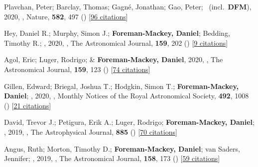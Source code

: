 \item[{\color{numcolor}\scriptsize55}] Plavchan, Peter; Barclay, Thomas; Gagn{\'e}, Jonathan; Gao, Peter; \etal\ (incl.\ \textbf{DFM}), 2020, , Nature, \textbf{582}, 497 () [\href{https://ui.adsabs.harvard.edu/abs/2020Natur.582..497P}{96 citations}]

\item[{\color{numcolor}\scriptsize54}] Hey, Daniel R.; Murphy, Simon J.; \textbf{Foreman-Mackey, Daniel}; Bedding, Timothy R.; \etal, 2020, , The Astronomical Journal, \textbf{159}, 202 () [\href{https://ui.adsabs.harvard.edu/abs/2020AJ....159..202H}{9 citations}]

\item[{\color{numcolor}\scriptsize53}] Agol, Eric; Luger, Rodrigo; \& \textbf{Foreman-Mackey, Daniel}, 2020, , The Astronomical Journal, \textbf{159}, 123 () [\href{https://ui.adsabs.harvard.edu/abs/2020AJ....159..123A}{74 citations}]

\item[{\color{numcolor}\scriptsize52}] Gillen, Edward; Briegal, Joshua T.; Hodgkin, Simon T.; \textbf{Foreman-Mackey, Daniel}; \etal, 2020, , Monthly Notices of the Royal Astronomical Society, \textbf{492}, 1008 () [\href{https://ui.adsabs.harvard.edu/abs/2020MNRAS.492.1008G}{21 citations}]

\item[{\color{numcolor}\scriptsize51}] David, Trevor J.; Petigura, Erik A.; Luger, Rodrigo; \textbf{Foreman-Mackey, Daniel}; \etal, 2019, , The Astrophysical Journal, \textbf{885} () [\href{https://ui.adsabs.harvard.edu/abs/2019ApJ...885L..12D}{70 citations}]

\item[{\color{numcolor}\scriptsize50}] Angus, Ruth; Morton, Timothy D.; \textbf{Foreman-Mackey, Daniel}; van Saders, Jennifer; \etal, 2019, , The Astronomical Journal, \textbf{158}, 173 () [\href{https://ui.adsabs.harvard.edu/abs/2019AJ....158..173A}{59 citations}]

